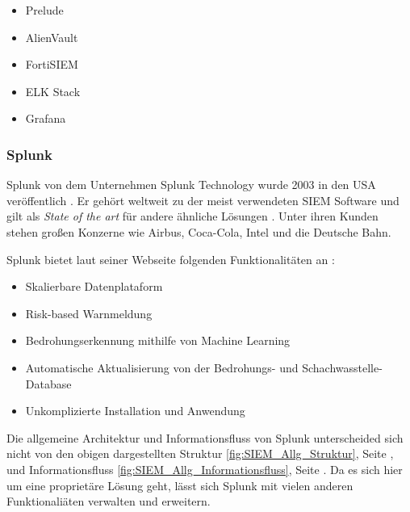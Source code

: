 \begin{itemize}[noitemsep]
   \item Prelude %
   \item AlienVault  %
   \item FortiSIEM %
   \item ELK Stack %
   \item Grafana %
\end{itemize}


\newpage
\subsubsection{Splunk}
Splunk von dem Unternehmen Splunk Technology wurde 2003 in den USA veröffentlich \citep{Splunk_splunk}. Er gehört weltweit zu der meist verwendeten \gls{SIEM} Software und gilt als \textit{State of the art} für andere ähnliche Lösungen \citep{Kazarov_Splunk}. Unter ihren Kunden stehen großen Konzerne wie Airbus, Coca-Cola, Intel und die Deutsche Bahn.

Splunk bietet laut seiner Webseite folgenden Funktionalitäten an \citep{Splunk_SPE}:

\begin{itemize}[noitemsep]
   \item Skalierbare Datenplataform
   \item Risk-based Warnmeldung 
   \item Bedrohungserkennung mithilfe von Machine Learning 
   \item Automatische Aktualisierung von der Bedrohungs- und Schachwasstelle-Database  
   \item Unkomplizierte Installation und Anwendung
\end{itemize}

Die allgemeine Architektur und Informationsfluss von Splunk unterscheided sich nicht von den obigen dargestellten Struktur \ref{fig:SIEM_Allg_Struktur}, Seite \pageref{fig:SIEM_Allg_Struktur}, und Informationsfluss \ref{fig:SIEM_Allg_Informationsfluss}, Seite \pageref{fig:SIEM_Allg_Informationsfluss}. Da es sich hier um eine proprietäre Lösung geht, lässt sich Splunk mit vielen anderen Funktionaliäten verwalten und erweitern. 

